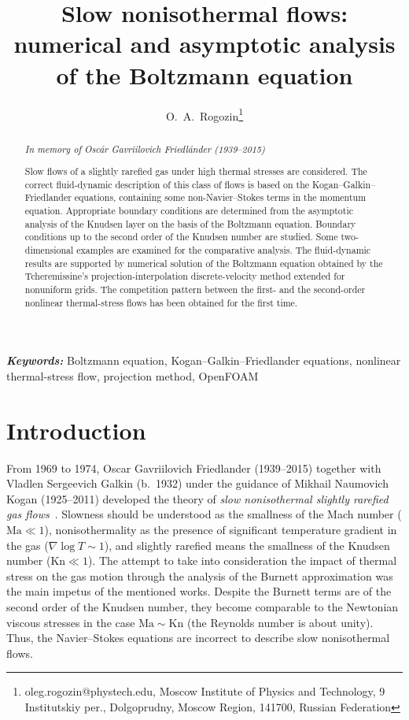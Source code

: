 \documentclass[10pt]{article}
\title{Slow nonisothermal flows: numerical and asymptotic analysis of the Boltzmann equation}
\author{O.~A.~Rogozin\thanks{oleg.rogozin@phystech.edu, Moscow Institute of Physics and Technology,
    9 Institutskiy per., Dolgoprudny, Moscow Region, 141700, Russian Federation}}
\date{}
\newcommand{\Kn}{\mathrm{Kn}}
\newcommand{\Ma}{\mathrm{Ma}}
\providecommand{\keywords}[1]{\textbf{\textit{Keywords:}} #1}
\begin{document}
\maketitle

\begin{abstract}
    \begin{flushright}
        {\it In memory of Osc\'{a}r Gavriilovich Friedl\'{a}nder (1939--2015)}
        \vspace{1em}
    \end{flushright}
    Slow flows of a slightly rarefied gas under high thermal stresses are considered.
    The correct fluid-dynamic description of this class of flows is based on the Kogan--Galkin--Friedlander equations,
    containing some non-Navier--Stokes terms in the momentum equation.
    Appropriate boundary conditions are determined from the asymptotic analysis of the Knudsen layer
    on the basis of the Boltzmann equation.
    Boundary conditions up to the second order of the Knudsen number are studied.
    Some two-dimensional examples are examined for the comparative analysis.
    The fluid-dynamic results are supported by numerical solution of the Boltzmann equation
    obtained by the Tcheremissine's projection-interpolation discrete-velocity method
    extended for nonuniform grids.
    The competition pattern between the first- and the second-order nonlinear thermal-stress flows
    has been obtained for the first time.
\end{abstract}

\keywords{
    Boltzmann equation,
    Kogan--Galkin--Friedlander equations,
    nonlinear thermal-stress flow,
    projection method,
    OpenFOAM
}

\section{Introduction}

From 1969 to 1974, Oscar Gavriilovich Friedlander (1939--2015) together with Vladlen Sergeevich Galkin (b.~1932)
under the guidance of Mikhail Naumovich Kogan (1925--2011) developed the theory of \emph{slow nonisothermal
slightly rarefied gas flows}~\cite{Kogan1970, Kogan1971, Friedlander1974, Galkin1974, Kogan1976}.
Slowness should be understood as the smallness of the Mach number (\(\Ma\ll1\)),
nonisothermality as the presence of significant temperature gradient in the gas (\(\nabla\log{T}\sim1\)),
and slightly rarefied means the smallness of the Knudsen number (\(\Kn\ll1\)).
The attempt to take into consideration the impact of thermal stress on the gas motion
through the analysis of the Burnett approximation was the main impetus of the mentioned works.
Despite the Burnett terms are of the second order of the Knudsen number,
they become comparable to the Newtonian viscous stresses in the case \(\Ma\sim\Kn\) (the Reynolds number is about unity).
Thus, the Navier--Stokes equations are incorrect to describe slow nonisothermal flows.
\end{document}
